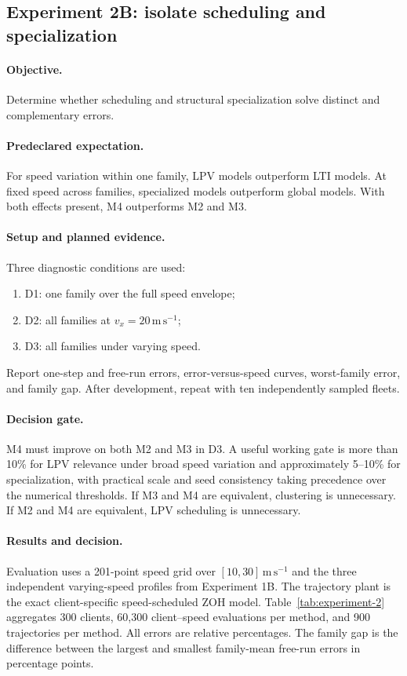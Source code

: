 \subsection{Experiment 2B: isolate scheduling and specialization}
\paragraph{Objective.}
Determine whether scheduling and structural specialization solve distinct and
complementary errors.

\paragraph{Predeclared expectation.}
For speed variation within one family, LPV models outperform LTI models. At fixed
speed across families, specialized models outperform global models. With both
effects present, M4 outperforms M2 and M3.

\paragraph{Setup and planned evidence.}
Three diagnostic conditions are used:
\begin{enumerate}
 \item D1: one family over the full speed envelope;
 \item D2: all families at $v_x=20\,\mathrm{m\,s^{-1}}$;
 \item D3: all families under varying speed.
\end{enumerate}
Report one-step and free-run errors, error-versus-speed curves, worst-family error,
and family gap. After development, repeat with ten independently sampled fleets.

\paragraph{Decision gate.}
M4 must improve on both M2 and M3 in D3. A useful working gate is more than 10\%
for LPV relevance under broad speed variation and approximately 5--10\% for
specialization, with practical scale and seed consistency taking precedence over
the numerical thresholds. If M3 and M4 are equivalent, clustering is unnecessary.
If M2 and M4 are equivalent, LPV scheduling is unnecessary.

\paragraph{Results and decision.}
Evaluation uses a 201-point speed grid over
$[10,30]\,\mathrm{m\,s^{-1}}$ and the three independent varying-speed profiles
from Experiment 1B.  The trajectory plant is the exact client-specific
speed-scheduled ZOH model.  Table~\ref{tab:experiment-2} aggregates 300 clients,
60,300 client--speed evaluations per method, and 900 trajectories per method.
All errors are relative percentages.  The family gap is the difference between
the largest and smallest family-mean free-run errors in percentage points.

